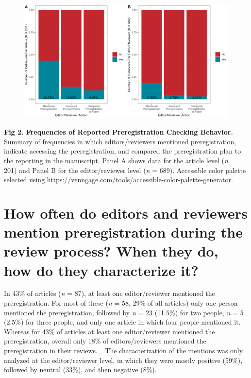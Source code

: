 \documentclass[authordate, empirical]{jote-new-article}
\begin{document}
	\begin{figure}
		\includegraphics[width=\linewidth]{media/image2.tiff}

		\caption{}

		\label{fig:rId11}


	\end{figure}







	\textbf{Fig 2. Frequencies of Reported Preregistration Checking Behavior.}\emph{ }Summary of frequencies in which editors/reviewers mentioned preregistration, indicate accessing the preregistration, and compared the preregistration plan to the reporting in the manuscript. Panel A shows data for the article level (\emph{n} = 201) and Panel B for the editor/reviewer level (\emph{n} = 689). Accessible color palette selected using https://venngage.com/tools/accessible-color-palette-generator.











	\section{\textbf{How often do editors and reviewers mention preregistration during the review process? When they do, how do they characterize it?}}



	In 43\% of articles (\emph{n} = 87), at least one editor/reviewer mentioned the preregistration. For most of these (\emph{n} = 58, 29\% of all articles) only one person mentioned the preregistration, followed by \emph{n} = 23 (11.5\%) for two people, \emph{n} = 5 (2.5\%) for three people, and only one article in which four people mentioned it. Whereas for 43\% of articles at least one editor/reviewer mentioned the preregistration, overall only 18\% of editors/reviewers mentioned the preregistration in their reviews. =The characterization of the mentions was only analyzed at the editor/reviewer level, in which they were mostly positive (59\%), followed by neutral (33\%), and then negative (8\%).
\end{document}
